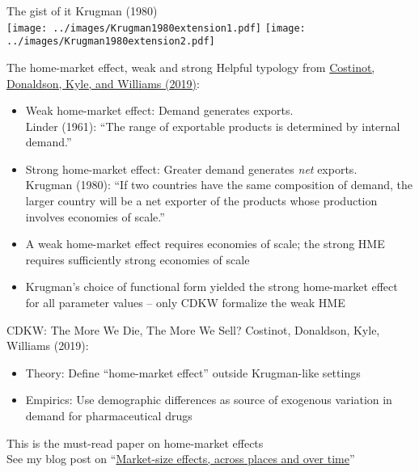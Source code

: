 \documentclass[11pt,notes=hide,aspectratio=169]{beamer}
\begin{document}
\begin{frame}{The gist of it}
Krugman (1980)\\
\hfill
\texttt{[image: ../images/Krugman1980extension1.pdf]} \hfill
\texttt{[image: ../images/Krugman1980extension2.pdf]}
\end{frame}
\begin{frame}{The home-market effect, weak and strong}
Helpful typology from \href{https://academic.oup.com/qje/article/134/2/843/5298504}{Costinot, Donaldson, Kyle, and Williams (2019)}:
\begin{itemize}
	\item Weak home-market effect: Demand generates exports.\\Linder (1961): ``The range of exportable products is determined by internal demand.''
	\item Strong home-market effect: Greater demand generates \textit{net} exports.\\ Krugman (1980): ``If two countries have the same composition of demand, the larger country will be a net exporter of the products whose production involves economies of scale.''
	\item A weak home-market effect requires economies of scale; the strong HME requires sufficiently strong economies of scale
	\item Krugman's choice of functional form yielded the strong home-market effect for all parameter values -- only CDKW formalize the weak HME
\end{itemize}
\end{frame}
\begin{frame}{CDKW: The More We Die, The More We Sell?}
Costinot, Donaldson, Kyle, Williams (2019):
\begin{itemize}
	\item Theory: Define ``home-market effect'' outside Krugman-like settings
	\item Empirics: Use demographic differences as source of exogenous variation in demand for pharmaceutical drugs
\end{itemize}
This is the must-read paper on home-market effects\\
\vspace{5mm}
\footnotesize{See my blog post on ``\href{https://tradediversion.net/2019/09/23/market-size-effects-across-places-and-over-time/}{Market-size effects, across places and over time}''}
\end{frame}
\end{document}
